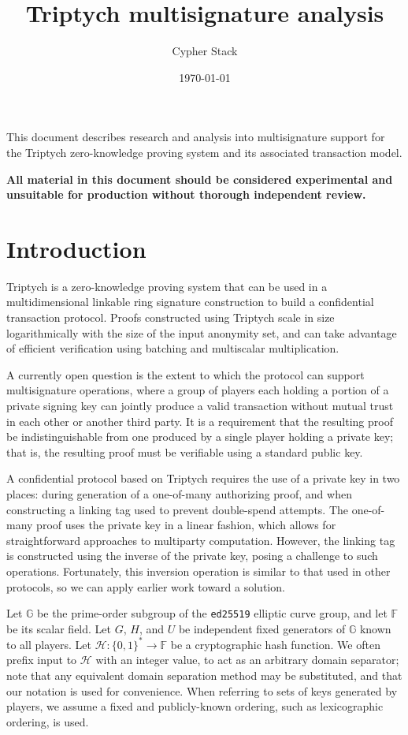 \documentclass{article}
\title{Triptych multisignature analysis}
\author{Cypher Stack}
\date{\today}
\newcommand{\F}{\mathbb{F}}
\newcommand{\G}{\mathbb{G}}
\newcommand{\hs}{\mathcal{H}}
\begin{document}
\maketitle

This document describes research and analysis into multisignature support for the Triptych zero-knowledge proving system and its associated transaction model.

\textbf{All material in this document should be considered experimental and unsuitable for production without thorough independent review.}


\section{Introduction}

Triptych \cite{triptych} is a zero-knowledge proving system that can be used in a multidimensional linkable ring signature construction to build a confidential transaction protocol.
Proofs constructed using Triptych scale in size logarithmically with the size of the input anonymity set, and can take advantage of efficient verification using batching and multiscalar multiplication.

A currently open question is the extent to which the protocol can support multisignature operations, where a group of players each holding a portion of a private signing key can jointly produce a valid transaction without mutual trust in each other or another third party.
It is a requirement that the resulting proof be indistinguishable from one produced by a single player holding a private key; that is, the resulting proof must be verifiable using a standard public key.

A confidential protocol based on Triptych requires the use of a private key in two places: during generation of a one-of-many authorizing proof, and when constructing a linking tag used to prevent double-spend attempts.
The one-of-many proof uses the private key in a linear fashion, which allows for straightforward approaches to multiparty computation.
However, the linking tag is constructed using the inverse of the private key, posing a challenge to such operations.
Fortunately, this inversion operation is similar to that used in other protocols, so we can apply earlier work toward a solution.

Let $\G$ be the prime-order subgroup of the \texttt{ed25519} elliptic curve group, and let $\F$ be its scalar field.
Let $G$, $H$, and $U$ be independent fixed generators of $\G$ known to all players.
Let $\hs: \{0,1\}^* \to \F$ be a cryptographic hash function.
We often prefix input to $\hs$ with an integer value, to act as an arbitrary domain separator; note that any equivalent domain separation method may be substituted, and that our notation is used for convenience.
When referring to sets of keys generated by players, we assume a fixed and publicly-known ordering, such as lexicographic ordering, is used.
\end{document}
